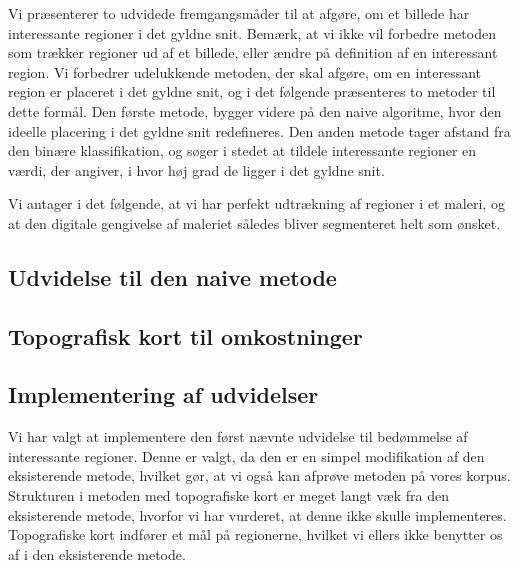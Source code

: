 {
{\sffamily Vi præsenterer to udvidede fremgangsmåder til at afgøre, om
et billede har interessante regioner i det gyldne snit. Bemærk, at vi
ikke vil forbedre metoden som trækker regioner ud af et billede, eller
ændre på definition af en interessant region. Vi forbedrer udelukkende
metoden, der skal afgøre, om en interessant region er placeret i det
gyldne snit, og i det følgende præsenteres to metoder til dette formål.
Den første metode, bygger videre på den naive algoritme, hvor den
ideelle placering i det gyldne snit redefineres. Den anden metode tager
afstand fra den binære klassifikation, og søger i stedet at tildele
interessante regioner en værdi, der angiver, i hvor høj grad de ligger i
det gyldne snit.

Vi antager i det følgende, at vi har perfekt udtrækning af regioner i et
maleri, og at den digitale gengivelse af maleriet således bliver
segmenteret helt som ønsket.
}

\subsection{Udvidelse til den naive metode\label{subsec_udvidet_massemidtpunkt}}


\subsection{Topografisk kort til omkostninger}


\subsection{Implementering af udvidelser}
Vi har valgt at implementere den først nævnte udvidelse til bedømmelse
af interessante regioner. Denne er valgt, da den er en simpel
modifikation af den eksisterende metode, hvilket gør, at vi også kan
afprøve metoden på vores korpus. Strukturen i metoden med topografiske
kort er meget langt væk fra den eksisterende metode, hvorfor vi har
vurderet, at denne ikke skulle implementeres. Topografiske kort indfører
et mål på regionerne, hvilket vi ellers ikke benytter os af i den
eksisterende metode.

}


